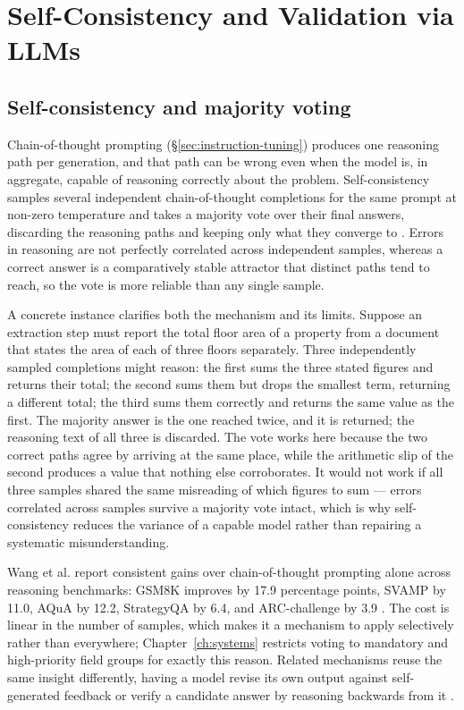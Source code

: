 \section{Self-Consistency and Validation via LLMs}
\label{sec:self-consistency-validation}

\subsection{Self-consistency and majority voting}
\label{sec:self-consistency}

Chain-of-thought prompting (\S\ref{sec:instruction-tuning}) produces one reasoning path per generation, and that path can be wrong even when the model is, in aggregate, capable of reasoning correctly about the problem. Self-consistency samples several independent chain-of-thought completions for the same prompt at non-zero temperature and takes a majority vote over their final answers, discarding the reasoning paths and keeping only what they converge to \citep{wang2023self}. Errors in reasoning are not perfectly correlated across independent samples, whereas a correct answer is a comparatively stable attractor that distinct paths tend to reach, so the vote is more reliable than any single sample.

A concrete instance clarifies both the mechanism and its limits. Suppose an extraction step must report the total floor area of a property from a document that states the area of each of three floors separately. Three independently sampled completions might reason: the first sums the three stated figures and returns their total; the second sums them but drops the smallest term, returning a different total; the third sums them correctly and returns the same value as the first. The majority answer is the one reached twice, and it is returned; the reasoning text of all three is discarded. The vote works here because the two correct paths agree by arriving at the same place, while the arithmetic slip of the second produces a value that nothing else corroborates. It would not work if all three samples shared the same misreading of which figures to sum --- errors correlated across samples survive a majority vote intact, which is why self-consistency reduces the variance of a capable model rather than repairing a systematic misunderstanding.

Wang et al. report consistent gains over chain-of-thought prompting alone across reasoning benchmarks: GSM8K improves by 17.9 percentage points, SVAMP by 11.0, AQuA by 12.2, StrategyQA by 6.4, and ARC-challenge by 3.9 \citep{wang2023self}. The cost is linear in the number of samples, which makes it a mechanism to apply selectively rather than everywhere; Chapter~\ref{ch:systems} restricts voting to mandatory and high-priority field groups for exactly this reason. Related mechanisms reuse the same insight differently, having a model revise its own output against self-generated feedback \citep{madaan2023self} or verify a candidate answer by reasoning backwards from it \citep{weng2023large}.


